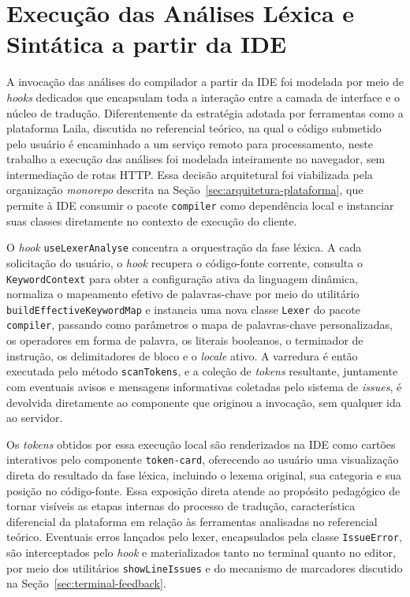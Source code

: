 \section{Execução das Análises Léxica e Sintática a partir da IDE}
\label{sec:execucao-analises}

A invocação das análises do compilador a partir da IDE foi modelada por meio de \textit{hooks} dedicados que encapsulam toda a interação entre a camada de interface e o núcleo de tradução. Diferentemente da estratégia adotada por ferramentas como a plataforma Laila, discutida no referencial teórico, na qual o código submetido pelo usuário é encaminhado a um serviço remoto para processamento, neste trabalho a execução das análises foi modelada inteiramente no navegador, sem intermediação de rotas HTTP. Essa decisão arquitetural foi viabilizada pela organização \textit{monorepo} descrita na Seção~\ref{sec:arquitetura-plataforma}, que permite à IDE consumir o pacote \texttt{compiler} como dependência local e instanciar suas classes diretamente no contexto de execução do cliente.

O \textit{hook} \texttt{useLexerAnalyse} concentra a orquestração da fase léxica. A cada solicitação do usuário, o \textit{hook} recupera o código-fonte corrente, consulta o \texttt{KeywordContext} para obter a configuração ativa da linguagem dinâmica, normaliza o mapeamento efetivo de palavras-chave por meio do utilitário \texttt{buildEffectiveKeywordMap} e instancia uma nova classe \texttt{Lexer} do pacote \texttt{compiler}, passando como parâmetros o mapa de palavras-chave personalizadas, os operadores em forma de palavra, os literais booleanos, o terminador de instrução, os delimitadores de bloco e o \textit{locale} ativo. A varredura é então executada pelo método \texttt{scanTokens}, e a coleção de \textit{tokens} resultante, juntamente com eventuais avisos e mensagens informativas coletadas pelo sistema de \textit{issues}, é devolvida diretamente ao componente que originou a invocação, sem qualquer ida ao servidor.

Os \textit{tokens} obtidos por essa execução local são renderizados na IDE como cartões interativos pelo componente \texttt{token-card}, oferecendo ao usuário uma visualização direta do resultado da fase léxica, incluindo o lexema original, sua categoria e sua posição no código-fonte. Essa exposição direta atende ao propósito pedagógico de tornar visíveis as etapas internas do processo de tradução, característica diferencial da plataforma em relação às ferramentas analisadas no referencial teórico. Eventuais erros lançados pelo lexer, encapsulados pela classe \texttt{IssueError}, são interceptados pelo \textit{hook} e materializados tanto no terminal quanto no editor, por meio dos utilitários \texttt{showLineIssues} e do mecanismo de marcadores discutido na Seção~\ref{sec:terminal-feedback}.

